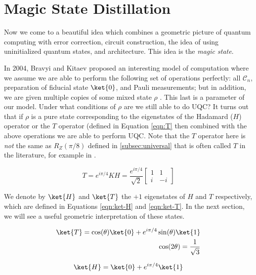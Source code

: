\section{Magic State Distillation}
\label{sec:magic}

Now we come to a beautiful idea which combines a geometric picture of
quantum computing with error correction, circuit construction, the idea of
using uninitialized quantum states, and architecture.
This idea is the \emph{magic state}.

In 2004, Bravyi and Kitaev proposed an interesting model of computation where
we assume we are able to perform the following set of operations
perfectly: all $\mathcal{C}_n$,
preparation of fiducial state $\ket{0}$, and Pauli measurements; but in
addition, we are given multiple copies of some mixed state $\rho$
\cite{Bravyi2004}. This last
is a parameter of our model. Under what conditions of $\rho$ are we still
able to do \textsc{UQC}? It turns out that
if $\rho$ is a pure state corresponding to the eigenstates of the Hadamard
($H$) operator or the $T$ operator (defined in Equation \ref{eqn:T}
then combined with the
above operations we are able to perform \textsc{UQC}. Note that the
$T$ operator here is \emph{not} the same as $R_Z(\pi/8)$ defined in
\ref{subsec:universal} that is
often called $T$ in the literature, for example in \cite{Nielsen2000}.

\begin{equation}
\label{eqn:T}
T = e^{i\pi / 4} KH = \frac{e^{i\pi/4}}{\sqrt{2}}
\left[ \begin{array}{cc}
1 & 1\\
i & -i
\end{array} \right]
\end{equation}

We denote by $\ket{H}$ and $\ket{T}$ the $+1$ eigenstates of $H$ and $T$
respectively, which are defined in Equations \ref{eqn:ket-H} and \ref{eqn:ket-T}.
In the next section, we will see a useful geometric
interpretation of these states.

\begin{eqnarray}
\ket{T} = \cos(\theta) \ket{0} + e^{i\pi / 4}\sin(\theta) \ket{1} \\
\label{eqn:ket-T}
\cos(2\theta) = \frac{1}{\sqrt{3}}
\end{eqnarray}

\begin{equation}
\ket{H} = \ket{0} + e^{i\pi/4} \ket{1}
\label{eqn:ket-H}
\end{equation}

